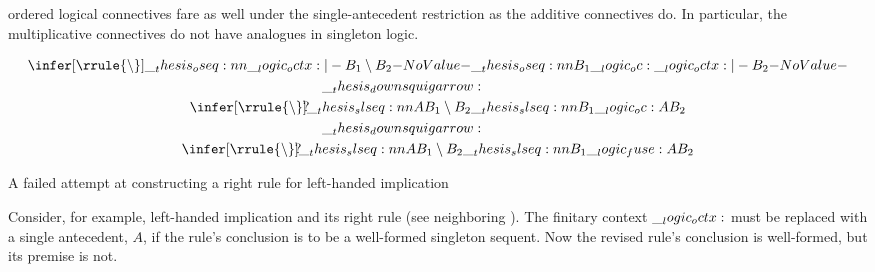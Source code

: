  ordered logical connectives fare as well under the single-antecedent restriction as the additive connectives do.
In particular, the multiplicative connectives do not have analogues in singleton logic.
% 
\begin{marginfigure}[12\baselineskip]
  \normalsize
  \begin{gather*}
    \infer[\rrule{\limp}]{\oseq{\octx |- B_1 \limp B_2}}{
      \oseq{B_1 \oc \octx |- B_2}}
    \\
    \mathord{\downsquigarrow}\hspace{5pt}\hphantom{\rrule{\limp}}
    \\
    \infer[\rrule{\limp}\mathrlap{?}]{\slseq{A |- B_1 \limp B_2}}{
      \slseq{B_1 \oc A |- B_2}}
    \\
    \mathord{\downsquigarrow}\hspace{5pt}\hphantom{\rrule{\limp}}
    \\
    \infer[\rrule{\limp}\mathrlap{?}]{\slseq{A |- B_1 \limp B_2}}{
      \slseq{B_1 \fuse A |- B_2}}
  \end{gather*}
  \caption{A failed attempt at constructing a right rule for left-handed implication}\label{fig:singleton-logic:seq-calc:derive-limp}
\end{marginfigure}%
%
Consider, for example, left-handed implication and its right rule (see neighboring ).
The finitary context $\__logic_octx:$ must be replaced with a single antecedent, $A$, if the rule's conclusion is to be a well-formed singleton sequent.
Now the revised rule's conclusion is well-formed, but its premise is not.


